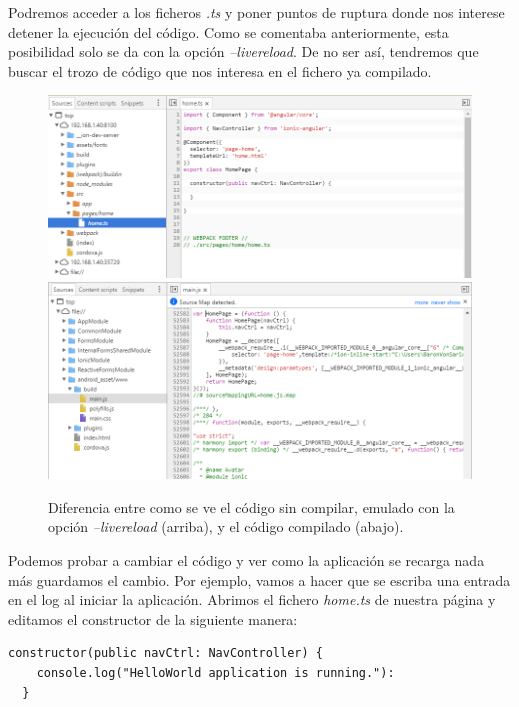 Podremos acceder a los ficheros \emph{.ts} y poner puntos de ruptura donde nos interese detener la ejecución del código. Como se comentaba anteriormente, esta posibilidad solo se da con la opción \emph{--livereload}. De no ser así, tendremos que buscar el trozo de código que nos interesa en el fichero ya compilado.

\begin{figure}[H]
\centering
    \centering
        \includegraphics[width=\textwidth]{Figures/ch2/BuildAndEmulate/livereload_code_dev_tool}
        \hfill \break
        \includegraphics[width=\textwidth]{Figures/ch2/BuildAndEmulate/nolivereload_code_dev_tool}
    \caption{Diferencia entre como se ve el código sin compilar, emulado con la opción \emph{--livereload} (arriba), y el código compilado (abajo).}
\end{figure}

Podemos probar a cambiar el código y ver como la aplicación se recarga nada más guardamos el cambio. Por ejemplo, vamos a hacer que se escriba una entrada en el log al iniciar la aplicación. Abrimos el fichero \emph{home.ts} de nuestra página y editamos el constructor de la siguiente manera:

{\begin{lstlisting}[style=htmlcssjs,frame=tlrb,xleftmargin={0.2cm}]
constructor(public navCtrl: NavController) {
    console.log("HelloWorld application is running."):
  }

\end{lstlisting}}

